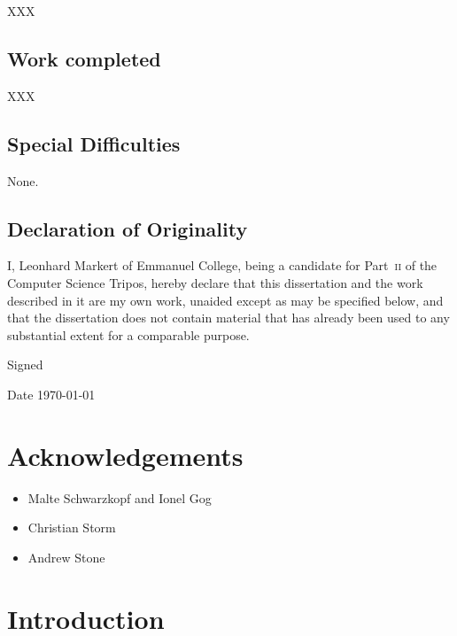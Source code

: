\documentclass[11pt,chapterprefix=true,toc=bibliography,numbers=noendperiod,
               footnotes=multiple,twoside]{scrreprt}
\begin{document}
XXX

\section*{Work completed\label{sc:work-completed}}

XXX

\section*{Special Difficulties\label{sc:special-difficulties}}

None.

\section*{Declaration of Originality\label{sc:declaration-of-originality}}

I, Leonhard Markert of Emmanuel College, being a candidate for Part~\textsc{ii} of the Computer Science Tripos, hereby declare that this dissertation and the work described in it are my own work, unaided except as may be specified below, and that the dissertation does not contain material that has already been used to any substantial extent for a comparable purpose.

\vspace{0.3in}
Signed

\vspace{0.2in}
Date \hspace{0.4in} \today

\chapter*{Acknowledgements\label{ch:acknowledgements}}

\begin{itemize}
    \item Malte Schwarzkopf and Ionel Gog
    \item Christian Storm
    \item Andrew Stone
\end{itemize}

\tableofcontents


\chapter{Introduction\label{ch:introduction}}

\end{document}
